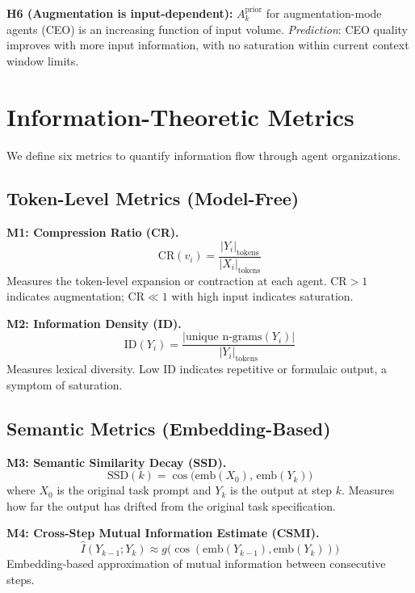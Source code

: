 \documentclass[conference]{IEEEtran}
\begin{document}
\textbf{H6 (Augmentation is input-dependent):}
$A_k^{\text{prior}}$ for augmentation-mode agents (CEO) is an increasing function of input volume.
\emph{Prediction}: CEO quality improves with more input information, with no saturation within current context window limits.


\section{Information-Theoretic Metrics}
\label{sec:metrics}

We define six metrics to quantify information flow through agent organizations.

\subsection{Token-Level Metrics (Model-Free)}

\textbf{M1: Compression Ratio (CR).}
\begin{equation}
    \text{CR}(v_i) = \frac{|Y_i|_{\text{tokens}}}{|X_i|_{\text{tokens}}}
\end{equation}
Measures the token-level expansion or contraction at each agent.
$\text{CR} > 1$ indicates augmentation; $\text{CR} \ll 1$ with high input indicates saturation.


\textbf{M2: Information Density (ID).}
\begin{equation}
    \text{ID}(Y_i) = \frac{|\text{unique n-grams}(Y_i)|}{|Y_i|_{\text{tokens}}}
\end{equation}
Measures lexical diversity. Low ID indicates repetitive or formulaic output, a symptom of saturation.


\subsection{Semantic Metrics (Embedding-Based)}

\textbf{M3: Semantic Similarity Decay (SSD).}
\begin{equation}
    \text{SSD}(k) = \cos\bigl(\text{emb}(X_0),\, \text{emb}(Y_k)\bigr)
\end{equation}
where $X_0$ is the original task prompt and $Y_k$ is the output at step $k$.
Measures how far the output has drifted from the original task specification.


\textbf{M4: Cross-Step Mutual Information Estimate (CSMI).}
\begin{equation}
    \hat{I}(Y_{k-1}; Y_k) \approx g\bigl(\cos(\text{emb}(Y_{k-1}), \text{emb}(Y_k))\bigr)
\end{equation}
Embedding-based approximation of mutual information between consecutive steps.
\end{document}
